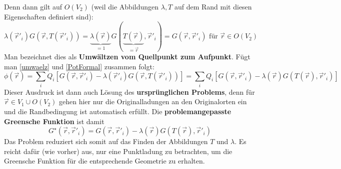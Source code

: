 			   Denn dann gilt auf $O(V_2)$ (weil die Abbildungen $\lambda,T$ auf dem Rand mit diesen Eigenschaften definiert sind):
			        \begin{equation}
				        \lambda(\vec{r}' _i) G(\vec{r} ,T(\vec{r}' _i)) =  \underbrace{\lambda(\vec{r} )}_{=1} G(\underbrace{T(\vec{r} )}_{=\vec{r} },\vec{r}' _i) =  G(\vec{r} ,\vec{r}' _i) \text{ für } \vec{r}  \in O(V_2)
			        \end{equation}
			   Man bezeichnet dies als \textbf{Umwältzen vom Quellpunkt zum Aufpunkt}.
			       Fügt man \ref{umwaelz} und \ref{PotFormal} zusammen folgt:
			        \begin{equation}
				        \phi(\vec{r} ) =  \sum_i Q_i \left[G(\vec{r} ,\vec{r}' _i) -\lambda(\vec{r}' _i) G(\vec{r} ,T(\vec{r}' _i))\right] =\sum_i Q_i \left[G(\vec{r} ,\vec{r}' _i) -\lambda(\vec{r} ) G(T(\vec{r} ),\vec{r}' _i)\right]
			        \end{equation}
			        Dieser Ausdruck ist dann auch Lösung des \textbf{ursprünglichen Problems}, denn für $\vec{r}  \in V_1 \cup O(V_2)$ gehen hier nur die Originalladungen an den Originalorten ein und die Randbedingung ist automatisch erfüllt.
			   Die \textbf{problemangepasste Greensche Funktion} ist damit
			        \begin{equation}\label{problemGreen}
				        \boxed{G^\star(\vec{r} ,\vec{r}' _i) = G(\vec{r} ,\vec{r}' _i) -\lambda(\vec{r} ) G(T(\vec{r} ),\vec{r}' _i)}
			        \end{equation}
			   Das Problem reduziert sich somit auf das Finden der Abbildungen $T$ und $\lambda$. Es reicht dafür (wie vorher) aus, nur eine Punktladung zu betrachten, um die Greensche Funktion für die entsprechende Geometrie zu erhalten.
